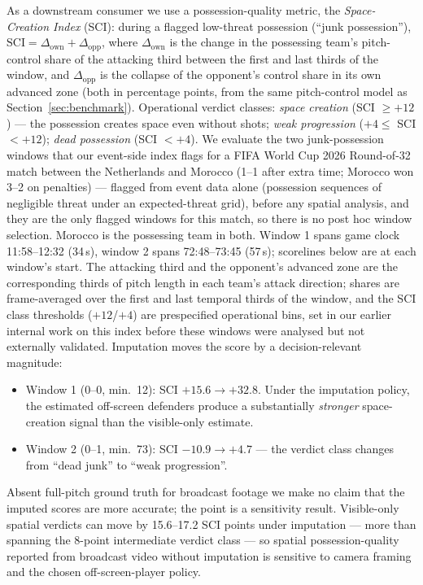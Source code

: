 \documentclass[11pt]{article}
\begin{document}
As a downstream consumer we use a possession-quality metric, the
\emph{Space-Creation Index} (SCI): during a flagged low-threat possession
(``junk possession''), $\mathrm{SCI} = \Delta_{\mathrm{own}} +
\Delta_{\mathrm{opp}}$, where $\Delta_{\mathrm{own}}$ is the change in the
possessing team's pitch-control share of the attacking third between the first
and last thirds of the window, and $\Delta_{\mathrm{opp}}$ is the collapse of
the opponent's control share in its own advanced zone (both in percentage
points, from the same pitch-control model as
Section~\ref{sec:benchmark}). Operational verdict classes: \emph{space
creation} (SCI $\ge +12$) --- the possession creates space even without
shots; \emph{weak progression} ($+4 \le$ SCI $< +12$); \emph{dead possession}
(SCI $< +4$). We evaluate the two junk-possession windows that our event-side index flags
for a FIFA World Cup 2026 Round-of-32 match between the Netherlands and Morocco
(1--1 after extra time; Morocco won 3--2 on penalties) --- flagged from event
data alone (possession sequences of negligible
threat under an expected-threat grid), before any spatial analysis, and they
are the only flagged windows for this match, so there is no post hoc window
selection. Morocco is the possessing team in both. Window 1 spans game clock
11:58--12:32 (34\,s), window 2 spans 72:48--73:45 (57\,s); scorelines below
are at each window's start. The attacking third and the opponent's advanced
zone are the corresponding thirds of pitch length in each team's attack
direction; shares are frame-averaged over the first and last temporal thirds
of the window, and the SCI class thresholds ($+12$/$+4$) are prespecified
operational bins, set in our earlier internal work on this index before these
windows were analysed but not externally validated. Imputation moves the score
by a decision-relevant magnitude:

\begin{itemize}
\item Window 1 (0--0, min.\ 12): SCI $+15.6 \to +32.8$. Under the imputation
policy, the estimated off-screen defenders produce a substantially
\emph{stronger} space-creation signal than the visible-only estimate.
\item Window 2 (0--1, min.\ 73): SCI $-10.9 \to +4.7$ --- the verdict class
changes from ``dead junk'' to ``weak progression''.
\end{itemize}

Absent full-pitch ground truth for broadcast footage we make no claim that the
imputed scores are more accurate; the point is a sensitivity result. Visible-only spatial
verdicts can move by 15.6--17.2 SCI points under imputation --- more than
spanning the 8-point intermediate verdict class --- so spatial
possession-quality reported from broadcast video without imputation is
sensitive to camera framing and the chosen off-screen-player policy.
\end{document}
